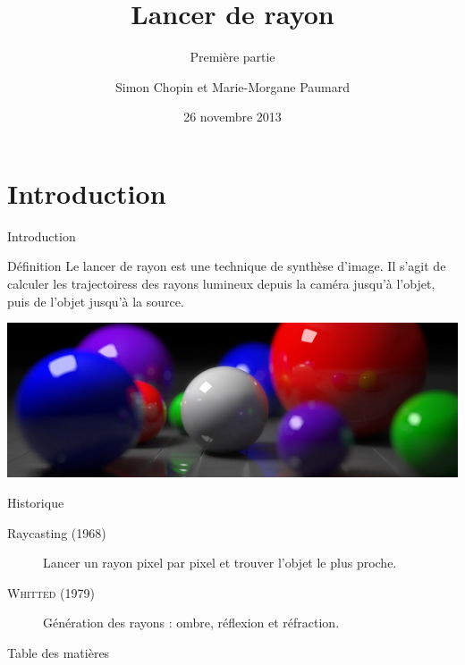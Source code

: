 \documentclass{beamer}
\title{Lancer de rayon}
\subtitle{Première partie}
\author{Simon Chopin et Marie-Morgane Paumard}
\date{26 novembre 2013}
\begin{document}
\begin{frame}
	\titlepage
\end{frame}

\section{Introduction}

\begin{frame}{Introduction}
\begin{alertblock}{Définition}
Le lancer de rayon est une technique de synthèse d'image. Il s'agit de calculer
les trajectoiress des rayons lumineux depuis la caméra jusqu'à l'objet, puis de
l'objet jusqu'à la source.
\end{alertblock}

\begin{center}
  \includegraphics[scale=0.2]{img/intro.jpg}
\end{center}

\begin{block}{Historique}
  \begin{description}
    \item[Raycasting (1968)] Lancer un rayon pixel par pixel et trouver l'objet
le plus proche.
    \item[\textsc{Whitted} (1979)] Génération des rayons : ombre, réflexion et
réfraction.
  \end{description}
\end{block}

\end{frame}

\begin{frame}{Table des matières}
	\tableofcontents
\end{frame}
\end{document}
